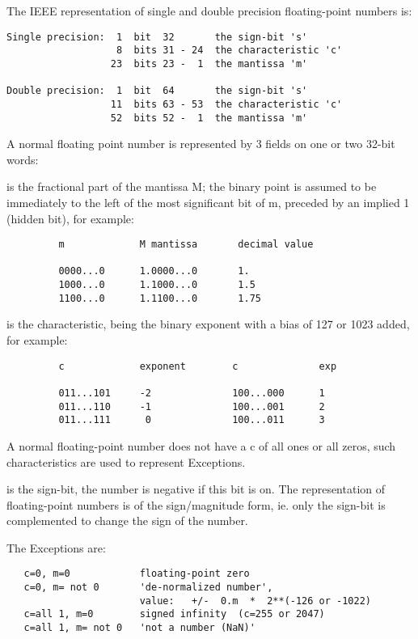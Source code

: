 The IEEE representation of
single and double precision floating-point numbers is:

\begin{verbatim}
Single precision:  1  bit  32       the sign-bit 's'
                   8  bits 31 - 24  the characteristic 'c'
                  23  bits 23 -  1  the mantissa 'm'

Double precision:  1  bit  64       the sign-bit 's'
                  11  bits 63 - 53  the characteristic 'c'
                  52  bits 52 -  1  the mantissa 'm'
\end{verbatim}

A normal floating point number is represented by 3 fields
on one or two 32-bit words:

 is the fractional part of the mantissa M;
the binary point is assumed to be immediately to the left
of the most significant bit of m,
preceded by an implied 1 (hidden bit), for example:

\begin{verbatim}
         m             M mantissa       decimal value

         0000...0      1.0000...0       1.
         1000...0      1.1000...0       1.5
         1100...0      1.1100...0       1.75
\end{verbatim}

 is the characteristic, being the binary exponent with a bias of
127 or 1023 added, for example:

\begin{verbatim}
         c             exponent        c              exp

         011...101     -2              100...000      1
         011...110     -1              100...001      2
         011...111      0              100...011      3
\end{verbatim}

A normal floating-point number does not have a c of all ones
or all zeros, such characteristics are used to represent Exceptions.

 is the sign-bit, the number is negative if this bit is on.
The representation of floating-point numbers is of the
sign/magnitude form, ie. only the sign-bit is complemented
to change the sign of the number.

The Exceptions are:
\begin{verbatim}
   c=0, m=0            floating-point zero
   c=0, m= not 0       'de-normalized number',
                       value:   +/-  0.m  *  2**(-126 or -1022)
   c=all 1, m=0        signed infinity  (c=255 or 2047)
   c=all 1, m= not 0   'not a number (NaN)'
\end{verbatim}

